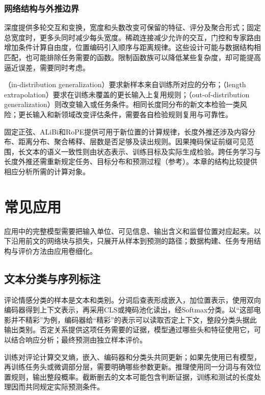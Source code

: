 \subsubsection{网络结构与外推边界}

深度提供多轮交互和变换，宽度和头数改变可保留的特征、评分及聚合形式；固定总宽度时，更多头同时减少每头宽度。稀疏连接减少允许的交互，门控和专家路由增加条件计算自由度，位置编码引入顺序与距离规律。这些设计可能与数据结构相匹配，也可能排除任务需要的函数。限制函数族可以降低某些复杂度，却可能提高逼近误差，需要同时考虑。

（in-distribution generalization）要求新样本来自训练所对应的分布；（length extrapolation）要求在训练未覆盖的更长输入上复用规则；（out-of-distribution generalization）则改变输入或任务条件。相同长度同分布的新文本检验一类风险；更长输入和新领域改变评估条件，需要各自检验规则复用与可靠性。

固定正弦、ALiBi和RoPE提供可用于新位置的计算规律，长度外推还涉及内容分布、距离分布、聚合稀释、层数是否足够及读出规则。因果掩码保证前缀可见范围，长文本的语义一致性则由状态表示、训练目标及实际生成检验。跨任务学习与长度外推还需重新规定任务、目标分布和预测过程（参考）。本章的结构比较提供相应分析所需的计算对象。

\section{常见应用}
\label{sec:transformer-applications}

应用中的完整模型需要把输入单位、可见信息、输出含义和监督位置对应起来。以下沿用前文的网络块与损失，只展开从样本到预测的路径；数据构建、任务专用结构与评价方法由应用卷细化。

\subsection{文本分类与序列标注}
\label{sec:transformer-text-applications}

评论情感分类的样本是文本和类别。分词后查表形成嵌入，加位置表示，使用双向编码器得到上下文表示，再采用CLS或掩码池化读出，经Softmax分类。以“这部电影并不精彩”为例，编码器给“精彩”的表示可以读取否定上下文，整段分类头据此输出类别。否定关系提供这项任务需要的证据，模型通过哪些头和特征使用它，可以结合响应分析；最终预测由独立样本评价。

训练对评论计算交叉熵，嵌入、编码器和分类头共同更新；如果先使用已有模型，再训练任务头或微调部分层，需要明确哪些参数更新。推理使用同一分词与有效位置规则，输出整段概率。截断删去的文本可能包含判断证据，训练和测试的长度处理因而共同规定实际预测条件。

